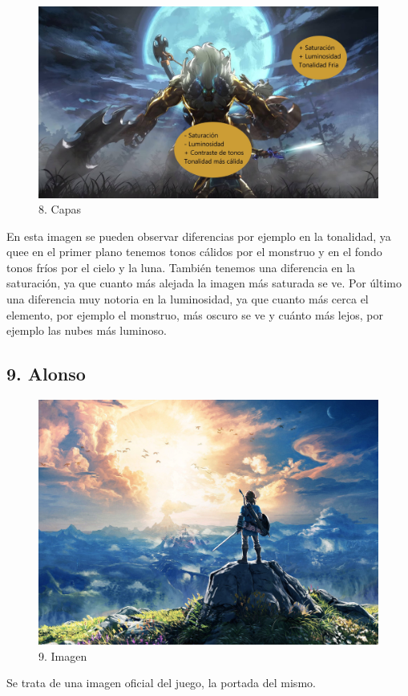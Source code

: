 \documentclass[12pt]{article}
\begin{document}
\begin{figure}[H]
      \centering
      \includegraphics[scale=0.25]{images/Raúl/Sección 8/Imagen 8 capas.jpg}
      \caption{\small 8. Capas}
    \end{figure}

En esta imagen se pueden observar diferencias por ejemplo en la tonalidad, ya quee en el primer plano tenemos tonos cálidos por el monstruo y en el fondo tonos fríos por el cielo y la luna. También tenemos una diferencia en la saturación, ya que cuanto más alejada la imagen más saturada se ve. Por último una diferencia muy notoria en la luminosidad, ya que cuanto más cerca el elemento, por ejemplo el monstruo, más oscuro se ve y cuánto más lejos, por ejemplo las nubes más luminoso.

        \newpage


    \subsection{9. Alonso}
    \begin{figure}[H]
      \centering
      \includegraphics[scale=0.1]{images/Concepts/9_concept_art}
      \caption{\small 9. Imagen}
    \end{figure}
    Se trata de una imagen oficial del juego, la portada del mismo.
\end{document}
